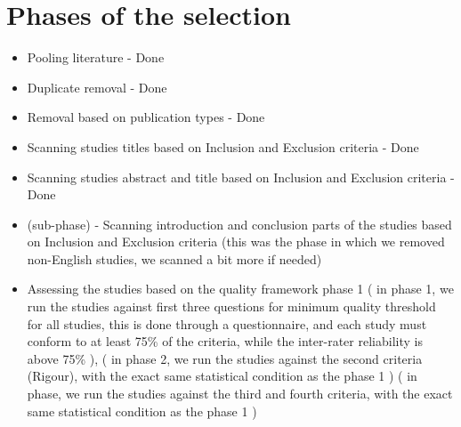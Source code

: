 \documentclass{article}
\theoremstyle{mytheoremstyle}
\theoremstyle{mytheoremstyle}
\theoremstyle{myproblemstyle}
\begin{document}
      \section{Phases of the selection}

      \begin{itemize}
        \item Pooling literature - Done
        \item Duplicate removal - Done  
        \item Removal based on publication types - Done 
        \item Scanning studies titles based on Inclusion and Exclusion criteria - Done  
        \item Scanning studies abstract and title based on Inclusion and Exclusion criteria - Done  
        \item (sub-phase) - Scanning introduction and conclusion parts of the studies based on Inclusion and Exclusion criteria (this was the phase in which we removed non-English studies, we scanned a bit more if needed)
        \item Assessing the studies based on the quality framework phase 1 ( in phase 1, we run the studies against first three questions for minimum quality threshold for all studies, this is done through a questionnaire, and each study must conform to at least 75\% of the criteria, while the inter-rater reliability is above 75\% ), ( in phase 2, we run the studies against the second criteria (Rigour), with the exact same statistical condition as the phase 1 ) ( in phase, we run the studies against the third and fourth criteria, with the exact same statistical condition as the phase 1 )
      \end{itemize}
\end{document}
